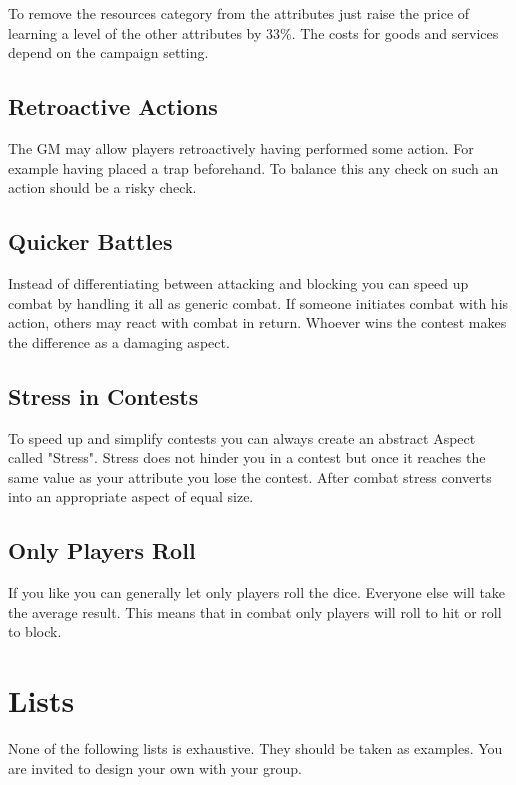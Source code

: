 \documentclass[11pt]{article}
\begin{document}
{To remove the resources category from the attributes just raise the price of learning a level of the other attributes by 33\%. The costs for goods and services
depend on the campaign setting.

\subsection{Retroactive Actions}
\label{sec:orgd186e58}

The GM may allow players retroactively having performed some action. For example having placed a trap beforehand. To balance this any check on such an action should be a risky check.

\subsection{Quicker Battles}
\label{sec:orgae3023d}

Instead of differentiating between attacking and blocking you can speed up combat by handling it all as generic combat. If someone initiates combat with his action, others may react with combat in return. Whoever wins the contest makes the difference as a damaging aspect.

\subsection{Stress in Contests}
\label{sec:orgaa8fc31}

To speed up and simplify contests you can always create an abstract Aspect called "Stress". Stress does not hinder you in a contest but once it reaches the same value as your attribute you lose the contest. After combat stress converts into an appropriate aspect of equal size.

\subsection{Only Players Roll}
\label{sec:org955b59b}
If you like you can generally let only players roll the dice. Everyone else will take the average result. This means that in combat only players will roll to hit or roll to block.

\newpage
\section{Lists}
\label{sec:org3ec4cdc}
None of the following lists is exhaustive. They should be taken as examples. You are invited to design your own with your group.

}
\end{document}
